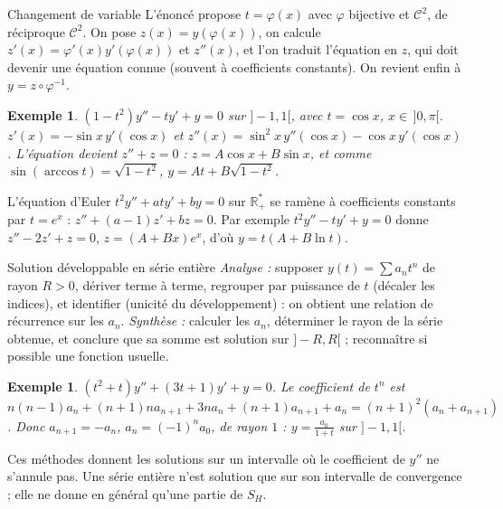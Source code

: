 \documentclass[a4paper,11pt]{article}
\numberwithin{equation}{section}
\numberwithin{figure}{section}
\numberwithin{table}{section}
\theoremstyle{enonce}
\theoremstyle{exemple}
\newtheorem{exemple}[definition]{Exemple}
\theoremstyle{remarque}
\newcommand{\R}{\mathbb{R}}
\begin{document}
\begin{methode}{Changement de variable}\label{m:chgt}
L'énoncé propose $t=\varphi(x)$ avec $\varphi$ bijective et $\mathcal C^2$, de réciproque $\mathcal C^2$. On pose
$z(x)=y(\varphi(x))$, on calcule $z'(x)=\varphi'(x)y'(\varphi(x))$ et $z''(x)$, et l'on traduit l'équation en $z$, qui doit
devenir une équation connue (souvent à coefficients constants). On revient enfin à $y=z\circ\varphi^{-1}$.
\end{methode}

\begin{exemple}
$(1-t^2)y''-ty'+y=0$ sur $]-1,1[$, avec $t=\cos x$, $x\in\,]0,\pi[$. $z'(x)=-\sin x\,y'(\cos x)$ et
$z''(x)=\sin^2x\,y''(\cos x)-\cos x\,y'(\cos x)$. L'équation devient $z''+z=0$ : $z=A\cos x+B\sin x$, et comme
$\sin(\arccos t)=\sqrt{1-t^2}$, $y=At+B\sqrt{1-t^2}$.
\end{exemple}

\begin{plusloin}
L'équation d'Euler $t^2y''+aty'+by=0$ sur $\R_+^*$ se ramène à coefficients constants par $t=e^x$ :
$z''+(a-1)z'+bz=0$. Par exemple $t^2y''-ty'+y=0$ donne $z''-2z'+z=0$, $z=(A+Bx)e^x$, d'où $y=t(A+B\ln t)$.
\end{plusloin}

\begin{methode}{Solution développable en série entière}\label{m:se}
\emph{Analyse :} supposer $y(t)=\sum a_nt^n$ de rayon $R>0$, dériver terme à terme, regrouper par puissance de $t$ (décaler
les indices), et identifier (unicité du développement) : on obtient une relation de récurrence sur les $a_n$.
\emph{Synthèse :} calculer les $a_n$, déterminer le rayon de la série obtenue, et conclure que sa somme est solution sur
$]-R,R[$ ; reconnaître si possible une fonction usuelle.
\end{methode}

\begin{exemple}
$(t^2+t)y''+(3t+1)y'+y=0$. Le coefficient de $t^n$ est $n(n-1)a_n+(n+1)na_{n+1}+3na_n+(n+1)a_{n+1}+a_n=(n+1)^2(a_n+a_{n+1})$.
Donc $a_{n+1}=-a_n$, $a_n=(-1)^na_0$, de rayon $1$ : $y=\frac{a_0}{1+t}$ sur $]-1,1[$.
\end{exemple}

\begin{attention}
Ces méthodes donnent les solutions sur un intervalle où le coefficient de $y''$ ne s'annule pas. Une série entière n'est
solution que sur son intervalle de convergence ; elle ne donne en général qu'une partie de $S_H$.
\end{attention}
\end{document}

